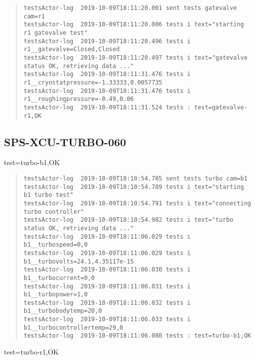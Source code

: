 \begin{quote}
\begin{tiny}
\begin{verbatim}
testsActor-log  2019-10-09T18:11:20.001 sent tests gatevalve cam=r1
testsActor-log  2019-10-09T18:11:20.006 tests i text="starting r1 gatevalve test"
testsActor-log  2019-10-09T18:11:20.496 tests i r1__gatevalve=Closed,Closed
testsActor-log  2019-10-09T18:11:20.497 tests i text="gatevalve status OK, retrieving data ..."
testsActor-log  2019-10-09T18:11:31.476 tests i r1__cryostatpressure=-1.33333,0.0057735
testsActor-log  2019-10-09T18:11:31.476 tests i r1__roughingpressure=-0.49,0.06
testsActor-log  2019-10-09T18:11:31.524 tests : test=gatevalve-r1,OK
\end{verbatim}
\end{tiny}
\end{quote}


\subsection{SPS-XCU-TURBO-060}
\label{sec:tc-060}

test=turbo-b1,OK

\begin{quote}
\begin{tiny}
\begin{verbatim}
testsActor-log  2019-10-09T18:10:54.785 sent tests turbo cam=b1
testsActor-log  2019-10-09T18:10:54.789 tests i text="starting b1 turbo test"
testsActor-log  2019-10-09T18:10:54.791 tests i text="connecting turbo controller"
testsActor-log  2019-10-09T18:10:54.982 tests i text="turbo status OK, retrieving data ..."
testsActor-log  2019-10-09T18:11:06.029 tests i b1__turbospeed=0,0
testsActor-log  2019-10-09T18:11:06.029 tests i b1__turbovolts=24.1,4.35117e-15
testsActor-log  2019-10-09T18:11:06.030 tests i b1__turbocurrent=0,0
testsActor-log  2019-10-09T18:11:06.031 tests i b1__turbopower=1,0
testsActor-log  2019-10-09T18:11:06.032 tests i b1__turbobodytemp=20,0
testsActor-log  2019-10-09T18:11:06.033 tests i b1__turbocontrollertemp=29,0
testsActor-log  2019-10-09T18:11:06.080 tests : test=turbo-b1,OK
\end{verbatim}
\end{tiny}
\end{quote}

\noindent test=turbo-r1,OK

